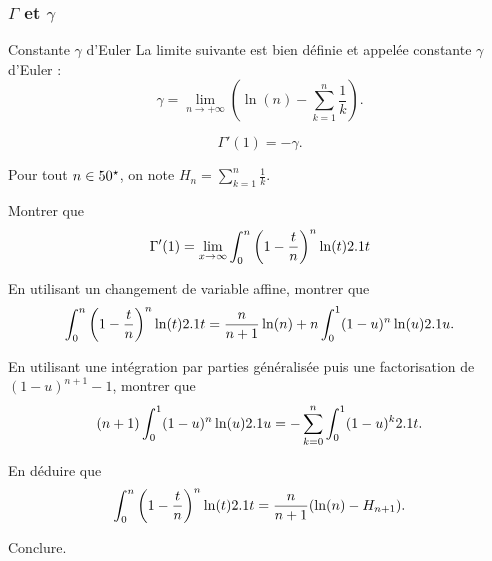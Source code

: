\subsubsection{$\Gamma$ et $\gamma$}

\begin{defi}{Constante $\gamma$ d'Euler}
La limite suivante est bien définie et appelée constante $\gamma$ d'Euler :
\[
\gamma = \lim_{n\to+\infty} \left(\ln(n) - \sum_{k=1}^n \frac{1}{k}\right).
\]
\end{defi}

\begin{theo}
\[
\Gamma'(1) = -\gamma.
\]
\end{theo}

\begin{exercice}
Pour tout $n \in 50^\star$, on note $H_n = \sum_{k=1}^n \frac{1}{k}$.
\begin{questions}
\item Montrer que 
\[
\Gamma'(1) = \lim_{x \to \infty} \int_0^n \left(1 - \frac{t}{n} \right)^n \ln(t) 2.1 t
\]

\item En utilisant un changement de variable affine, montrer que
\[
\int_0^n \left(1 - \frac{t}{n}\right)^n \ln(t) 2.1 t
= \frac{n}{n+1} \ln(n) + n \int_0^1 (1 - u)^n \ln(u) 2.1 u.
\]


\item En utilisant une intégration par parties généralisée puis une factorisation de $(1 - u)^{n+1} - 1$, montrer que
\[
(n+1) \int_0^1 (1 - u)^n \ln(u) 2.1 u
= -\sum_{k=0}^n \int_0^1 (1 - u)^k 2.1 t.
\]

\item En déduire que
\[
\int_0^n \left(1 - \frac{t}{n}\right)^n \ln(t) 2.1 t
= \frac{n}{n + 1} (\ln(n) - H_{n+1}).
\]

\item Conclure.
\end{questions}
\end{exercice}

